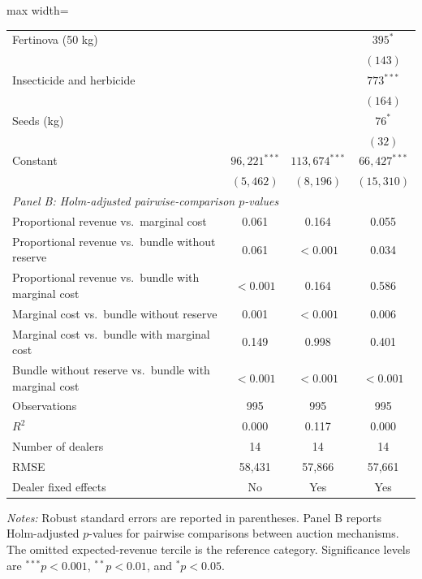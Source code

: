 \documentclass[11pt]{article}
\begin{document}
\begin{table}[!htbp]
\begin{threeparttable}
\begin{adjustbox}{max width=\textwidth}
\begin{tabular}{lccc}
Fertinova (50 kg)
    & & & $395^{*}$ \\
    & & & $(143)$ \\

Insecticide and herbicide
    & & & $773^{***}$ \\
    & & & $(164)$ \\

Seeds (kg)
    & & & $76^{*}$ \\
    & & & $(32)$ \\[2pt]

Constant
    & $96{,}221^{***}$
    & $113{,}674^{***}$
    & $66{,}427^{***}$ \\
    & $(5{,}462)$
    & $(8{,}196)$
    & $(15{,}310)$ \\

\midrule
\multicolumn{4}{l}{\textit{Panel B: Holm-adjusted pairwise-comparison $p$-values}} \\[2pt]

Proportional revenue vs.\ marginal cost
    & 0.061 & 0.164 & 0.055 \\

Proportional revenue vs.\ bundle without reserve
    & 0.061 & $<0.001$ & 0.034 \\

Proportional revenue vs.\ bundle with marginal cost
    & $<0.001$ & 0.164 & 0.586 \\

Marginal cost vs.\ bundle without reserve
    & 0.001 & $<0.001$ & 0.006 \\

Marginal cost vs.\ bundle with marginal cost
    & 0.149 & 0.998 & 0.401 \\

Bundle without reserve vs.\ bundle with marginal cost
    & $<0.001$ & $<0.001$ & $<0.001$ \\

\midrule
Observations & 995 & 995 & 995 \\
$R^{2}$ & 0.000 & 0.117 & 0.000 \\
Number of dealers & 14 & 14 & 14 \\
RMSE & 58,431 & 57,866 & 57,661 \\
Dealer fixed effects & No & Yes & Yes \\
\bottomrule
\end{tabular}
\end{adjustbox}

\begin{tablenotes}[flushleft]
\footnotesize
\item \textit{Notes:} Robust standard errors are reported in parentheses.
Panel B reports Holm-adjusted $p$-values for pairwise comparisons between
auction mechanisms. The omitted expected-revenue tercile is the reference
category. Significance levels are
$^{***}p<0.001$, $^{**}p<0.01$, and $^{*}p<0.05$.
\end{tablenotes}

\end{threeparttable}
\end{table}
\end{document}
